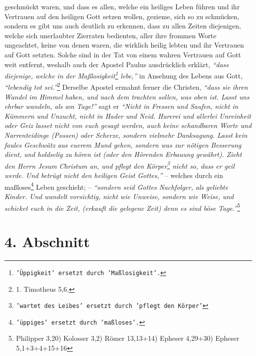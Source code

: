 geschmückt waren,
und dass es allen, welche ein heiliges Leben führen und ihr Vertrauen auf den
heiligen Gott setzen wollen, gezieme, sich so zu schmücken, sondern es gibt uns
auch deutlich zu erkennen, dass zu allen Zeiten diejenigen, welche sich
unerlaubter Zierraten bedienten, aller ihre frommen Worte ungeachtet, keine von
denen waren, die wirklich heilig lebten und ihr Vertrauen auf Gott setzten.
Solche sind in der Tat von einem wahren Vertrauen auf Gott weit entfernt,
weshalb auch der Apostel Paulus ausdrücklich erklärt,
\textit{"`dass diejenige, welche
in der Maßlosigkeit\footnote{\texttt{'Üppigkeit' ersetzt durch 'Maßlosigkeit'.}}
lebe,"'} in
Ansehung des Lebens aus Gott,
\textit{"`lebendig tot sei."'}\footnote{1. Timotheus 5,6.}
Derselbe Apostel ermahnt ferner die Christen,
\textit{"`dass sie ihren Wandel im Himmel haben, und nach dem trachten sollen,
was oben
ist. Lasst uns ehrbar wandeln, als am Tage!"'} sagt er
\textit{"`Nicht in Fressen und
Saufen, nicht in Kümmern und Unzucht, nicht in Hader und Neid. Hurerei und
allerlei Unreinheit oder Geiz lasset nicht von euch gesagt werden, auch keine
schandbaren Worte und Narrenteidinge (Possen) oder Scherze, sondern vielmehr
Danksagung. Lasst kein faules Geschwätz aus euerem Mund gehen, sondern was zur
nötigen Besserung dient, und holdselig zu hören ist (oder den Hörenden
Erbauung gewährt). Zieht den Herrn Jesum Christum an, und pflegt den
Körper\footnote{\texttt{'wartet des Leibes'
ersetzt durch 'pflegt den Körper'}}
nicht so, dass er geil werde. Und betrügt nicht den heiligen Geist Gottes,"'} --
welches durch ein maßloses\footnote{\texttt{'üppiges' ersetzt durch 'maßloses'.}}
Leben geschieht; --
\textit{"`sondern seid Gottes Nachfolger,
als geliebte Kinder. Und wandelt vorsichtig, nicht wie Unweise, sondern wie
Weise, und schicket euch in die Zeit, (erkauft die gelegene Zeit) denn es sind
böse Tage."'}\footnote{Philipper 3,20) Kolosser 3,2) Römer 13,13+14) Epheser
4,29+30) Epheser 5,1+3+4+15+16}

\section{4. Abschnitt} \label{kap15_ab4}

